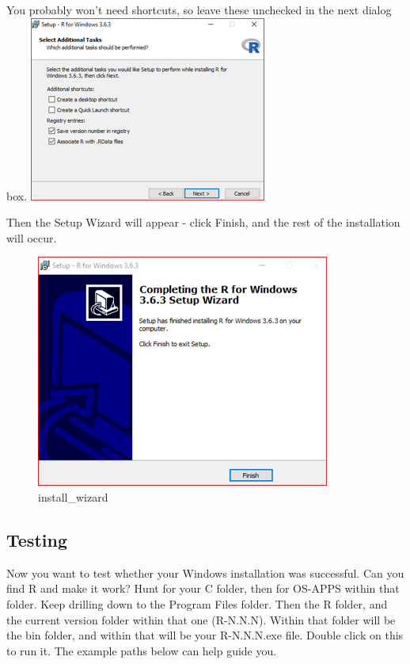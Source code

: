 \documentclass[
]{book}
\begin{document}
You probably won't need shortcuts, so leave these unchecked in the next dialog box.
\includegraphics{images/installraddltasks.png}

Then the Setup Wizard will appear - click Finish, and the rest of the installation will occur.

\begin{figure}
\centering
\includegraphics{images/installrwizard.png}
\caption{install\_wizard}
\end{figure}

\hypertarget{testing}{%
\subsection{Testing}\label{testing}}

Now you want to test whether your Windows installation was successful. Can you find R and make it work?
Hunt for your C folder, then for OS-APPS within that folder. Keep drilling down to the Program Files folder. Then the R folder, and the current version folder within that one (R-N.N.N). Within that folder will be the bin folder, and within that will be your R-N.N.N.exe file. Double click on this to run it. The example paths below can help guide you.
\end{document}
